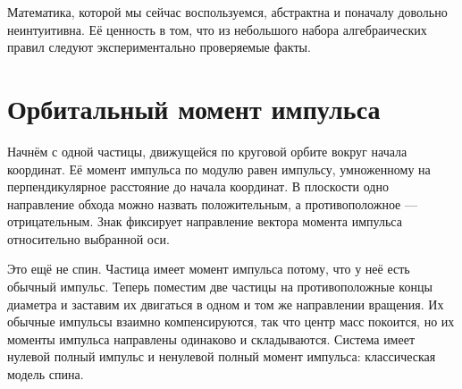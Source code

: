 \begin{classroomqa}
\end{classroomqa}

Математика, которой мы сейчас воспользуемся, абстрактна и поначалу довольно неинтуитивна. Её ценность в том, что из небольшого набора алгебраических правил следуют экспериментально проверяемые факты.

\section{Орбитальный момент импульса}

Начнём с одной частицы, движущейся по круговой орбите вокруг начала координат. Её момент импульса по модулю равен импульсу, умноженному на перпендикулярное расстояние до начала координат. В плоскости одно направление обхода можно назвать положительным, а противоположное — отрицательным. Знак фиксирует направление вектора момента импульса относительно выбранной оси.

Это ещё не спин. Частица имеет момент импульса потому, что у неё есть обычный импульс. Теперь поместим две частицы на противоположные концы диаметра и заставим их двигаться в одном и том же направлении вращения. Их обычные импульсы взаимно компенсируются, так что центр масс покоится, но их моменты импульса направлены одинаково и складываются. Система имеет нулевой полный импульс и ненулевой полный момент импульса: классическая модель спина.

